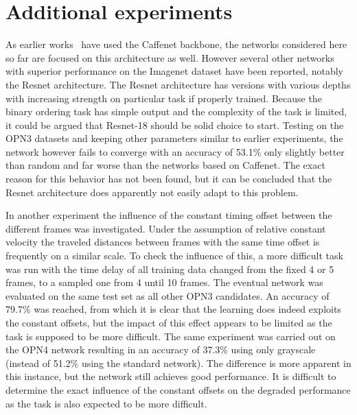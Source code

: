 \section{Additional experiments}
As earlier works~\cite{misra2016,lee2017} have used the Caffenet backbone, the networks considered here so far are focused on this architecture as well. However several other networks with superior performance on the Imagenet dataset have been reported, notably the Resnet architecture\cite{he2016}. The Resnet architecture has versions with various depths with increasing strength on particular task if properly trained. Because the binary ordering task has simple output and the complexity of the task is limited, it could be argued that Resnet-18 should be solid choice to start. Testing on the OPN3 datasets and keeping other parameters similar to earlier experiments, the network however fails to converge with an accuracy of 53.1\% only slightly better than random and far worse than the networks based on Caffenet. The exact reason for this behavior has not been found, but it can be concluded that the Resnet architecture does apparently not easily adapt to this problem.

In another experiment the influence of the constant timing offset between the different frames was investigated. Under the assumption of relative constant velocity the traveled distances between frames with the same time offset is frequently on a similar scale. To check the influence of this, a more difficult task was run with the time delay of all training data changed from the fixed 4 or 5 frames, to a sampled one from 4 until 10 frames. The eventual network was evaluated on the same test set as all other OPN3 candidates. An accuracy of 79.7\% was reached, from which it is clear that the learning does indeed exploits the constant offsets, but the impact of this effect appears to be limited as the task is supposed to be more difficult. The same experiment was carried out on the OPN4 network resulting in an accuracy of 37.3\% using only grayscale (instead of 51.2\% using the standard network). The difference is more apparent in this instance, but the network still achieves good performance. It is difficult to determine the exact influence of the constant offsets on the degraded performance as the task is also expected to be more difficult. 

